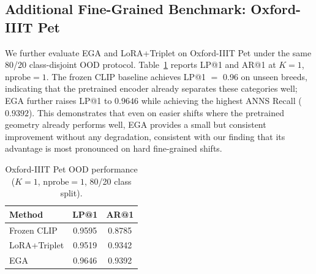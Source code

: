 \documentclass{article}
\begin{document}
\subsection{Additional Fine-Grained Benchmark: Oxford-IIIT Pet}
\label{appendix:pet}

We further evaluate EGA and LoRA+Triplet on Oxford-IIIT Pet under the same 80/20 class-disjoint OOD protocol.
Table~\ref{tab:pet_ood} reports LP@1 and AR@1 at $K{=}1$, $\text{nprobe}{=}1$.
The frozen CLIP baseline achieves LP@1 $=$ 0.96 on unseen breeds, indicating that the pretrained encoder already separates these categories well; EGA further raises LP@1 to $0.9646$ while achieving the highest ANNS Recall ($0.9392$).
This demonstrates that even on easier shifts where the pretrained geometry already performs well, EGA provides a small but consistent improvement without any degradation, consistent with our finding that its advantage is most pronounced on hard fine-grained shifts.

\begin{table}[!h]
	\centering
	\caption{Oxford-IIIT Pet OOD performance ($K{=}1$, $\text{nprobe}{=}1$, 80/20 class split).}
	\label{tab:pet_ood}
	\small
	\begin{tabular}{lcc}
		\toprule
		Method       & LP@1   & AR@1   \\
		\midrule
		Frozen CLIP  & 0.9595 & 0.8785 \\
		LoRA+Triplet & 0.9519 & 0.9342 \\
		EGA          & 0.9646 & 0.9392 \\
		\bottomrule
	\end{tabular}
\end{table}
\end{document}
